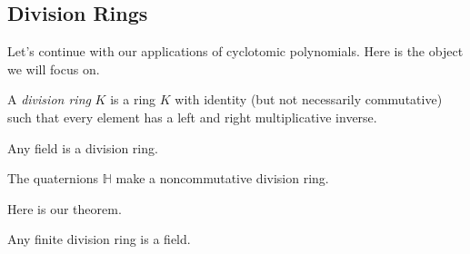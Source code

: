 \documentclass[../notes.tex]{subfiles}
\begin{document}
\subsection{Division Rings}
Let's continue with our applications of cyclotomic polynomials. Here is the object we will focus on.
\begin{definition}
	A \textit{division ring} $K$ is a ring $K$ with identity (but not necessarily commutative) such that every element has a left and right multiplicative inverse.
\end{definition}
\begin{example}
	Any field is a division ring.
\end{example}
\begin{example}
	The quaternions $\mathbb H$ make a noncommutative division ring.
\end{example}
Here is our theorem.
\begin{theorem}[Wedderburn]
	Any finite division ring is a field.
\end{theorem}
\end{document}
